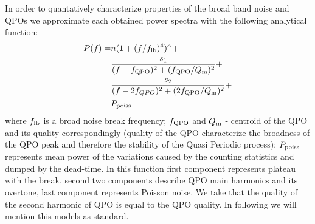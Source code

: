 \documentclass[a4paper,fleqn,usenatbib]{mnras}
\begin{document}
In order to quantatively characterize properties of the broad band noise and QPOs we approximate each obtained power spectra with the following analytical function:
\begin{equation}
        \begin{aligned}
                P(f)  = & n (1 + (f/f_{\rm lb})^4)^{\alpha} + \\
                     &\frac{s_1}{(f - f_{\rm QPO})^2 + (f_{\rm QPO}/Q_{\rm m})^2} +\\
                        & \frac{s_2}{(f - 2f_{QPO})^2 + (2f_{\rm QPO}/Q_{\rm m})^2} + \\
                        & P_{\rm poiss}
\end{aligned}
        \label{eq:complex_fit}
\end{equation}
where $f_{\rm lb}$ is a broad noise break frequency; $f_{\rm QPO}$ and $Q_{\rm m}$ - centroid of the QPO and its quality correspondingly (quality of the QPO characterize the broadness of the QPO peak and therefore the stability of the Quasi Periodic process); $P_{\rm poiss}$ represents mean power of the variations caused by the counting statistics and dumped by the dead-time.
In this function first component represents plateau with the break, second two components describe QPO main harmonics and its overtone, last component represents Poisson noise.
We take that the quality of the second harmonic of QPO is equal to the QPO quality.
In following we will mention this models as standard.
\end{document}
